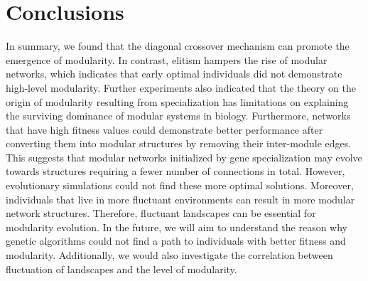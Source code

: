 \section{Conclusions}
In summary, we found that the diagonal crossover mechanism can promote the emergence of modularity. In contrast, elitism hampers the rise of modular networks, which indicates that early optimal individuals did not demonstrate high-level modularity. Further experiments also indicated that the theory on the origin of modularity resulting from specialization has limitations on explaining the surviving dominance of modular systems in biology. Furthermore, networks that have high fitness values could demonstrate better performance after converting them into modular structures by removing their inter-module edges. This suggests that modular networks initialized by gene specialization may evolve towards structures requiring a fewer number of connections in total. However, evolutionary simulations could not find these more optimal solutions. Moreover, individuals that live in more fluctuant environments can result in more modular network structures. Therefore, fluctuant landscapes can be essential for modularity evolution. In the future, we will aim to understand the reason why genetic algorithms could not find a path to individuals with better fitness and modularity. Additionally, we would also investigate the correlation between fluctuation of landscapes and the level of modularity. 